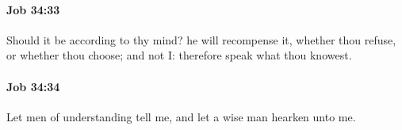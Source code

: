		\paragraph{Job 34:33} %
			\label{JOB-34-33}

			Should it be according to thy mind? he will recompense it, whether thou refuse, or whether thou choose; and not I: therefore speak what thou knowest.


		\paragraph{Job 34:34} %
			\label{JOB-34-34}

			Let men of understanding tell me, and let a wise man hearken unto me.


